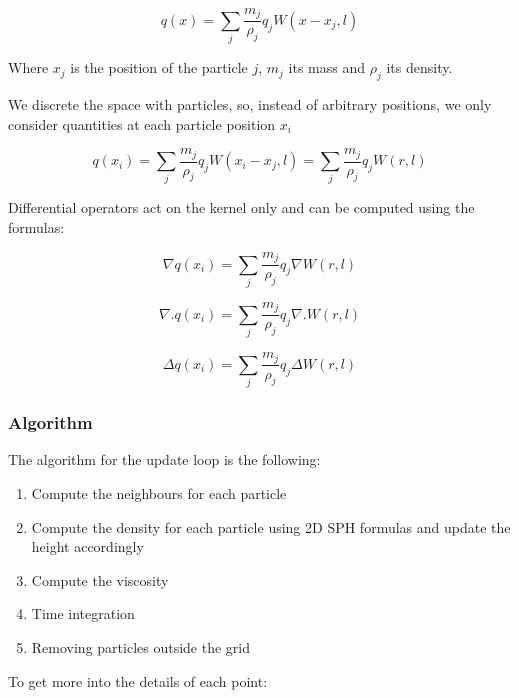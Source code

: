 \documentclass{article}
\begin{document}
\begin{equation}\label{sph}
    q(x) = \sum_j{\frac{m_j}{\rho_j}q_jW(x-x_j, l)}
\end{equation}

Where $x_j$ is the position of the particle $j$, $m_j$ its mass and $\rho_j$ its density.

We discrete the space with particles, so, instead of arbitrary positions, we only consider quantities at each particle position $x_i$

\begin{equation}\label{sph discrete}
    q(x_i) = \sum_j{\frac{m_j}{\rho_j}q_jW(x_i-x_j, l)} = \sum_j{\frac{m_j}{\rho_j}q_jW(r, l)}
\end{equation}

Differential operators act on the kernel only and can be computed using the formulas:

\begin{equation}\label{sph gradient}
    \nabla q(x_i) = \sum_j{\frac{m_j}{\rho_j} q_j \nabla W(r, l)}
\end{equation}

\begin{equation}\label{sph divergence}
    \nabla.q(x_i) = \sum_j{\frac{m_j}{\rho_j} q_j \nabla.W(r, l)}
\end{equation}

\begin{equation}\label{sph laplacien}
    \Delta q(x_i) = \sum_j{\frac{m_j}{\rho_j} q_j \Delta W(r, l)}
\end{equation}

\subsubsection*{Algorithm}

The algorithm for the update loop is the following:

\begin{enumerate}
    \item Compute the neighbours for each particle
    \item Compute the density for each particle using 2D SPH formulas and update the height accordingly
    \item Compute the viscosity
    \item Time integration
    \item Removing particles outside the grid
\end{enumerate}

\begin{flushleft}
To get more into the details of each point:
\end{flushleft}
\end{document}
